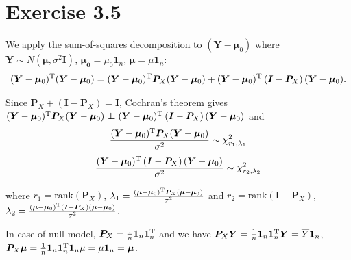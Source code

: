 \section*{Exercise 3.5}
We apply the sum-of-squares decomposition to $(\bm{Y} - \bm{\mu}_{0})$ where $\bm{Y} \sim N(\bm{\mu}, \sigma^2 \bm{I})$, $\bm{\mu_{0}} = \mu_{0}\bm{1}_{n}$, $\bm{\mu} = \mu\bm{1}_{n}$:
\begin{align*}
(\bm{Y} - \bm{\mu}_{0})^{\rm T}(\bm{Y} - \bm{\mu}_{0}) = (\bm{Y} - \bm{\mu}_{0})^{\rm T}\bm{P}_{X}(\bm{Y} - \bm{\mu}_{0}) + (\bm{Y} - \bm{\mu}_{0})^{\rm T}\left(\bm{I} - \bm{P}_{X} \right)(\bm{Y} - \bm{\mu}_{0}).
\end{align*}

Since $\bm{P}_{X} + (\bm{I} -\bm{P}_{X}) = \bm{I}$, Cochran's theorem gives $(\bm{Y} - \bm{\mu}_{0})^{\rm T}\bm{P}_{X}(\bm{Y} - \bm{\mu}_{0}) \independent (\bm{Y} - \bm{\mu}_{0})^{\rm T}\left(\bm{I} - \bm{P}_{X} \right)(\bm{Y} - \bm{\mu}_{0})$ and
\begin{align*}
\frac{(\bm{Y} - \bm{\mu}_{0})^{\rm T}\bm{P}_{X}(\bm{Y} - \bm{\mu}_{0})}{\sigma^2} \sim \chi_{r_{1}, \lambda_{1}}^2
\end{align*}
\begin{align*}
\frac{(\bm{Y} - \bm{\mu}_{0})^{\rm T}\left(\bm{I} - \bm{P}_{X} \right)(\bm{Y} - \bm{\mu}_{0})}{\sigma^2} \sim \chi_{r_{2}, \lambda_{2}}^2
\end{align*}

where $r_{1} = \mathrm{rank}(\bm{P}_{X})$, $\lambda_{1} = \frac{(\bm{\mu} - \bm{\mu}_{0})^{\rm T} \bm{P}_{X} (\bm{\mu} - \bm{\mu}_{0})}{\sigma^2}$ and $r_{2} = \mathrm{rank}(\bm{I} - \bm{P}_{X})$, $\lambda_{2} = \frac{(\bm{\mu} - \bm{\mu}_{0})^{\rm T}\left(\bm{I} - \bm{P}_{X} \right)(\bm{\mu} - \bm{\mu}_{0})}{\sigma^2}$.


In case of null model, $\bm{P}_{X} = \frac{1}{n}\bm{1}_{n}\bm{1}_{n}^{\rm T}$ and we have $\bm{P}_{X}\bm{Y} = \frac{1}{n}\bm{1}_{n}\bm{1}_{n}^{\rm T}\bm{Y} = \overline{Y}\bm{1}_{n}$, $\bm{P}_{X}\bm{\mu} = \frac{1}{n}\bm{1}_{n}\bm{1}_{n}^{\rm T}\bm{1}_{n}\mu = \mu\bm{1}_{n} = \bm{\mu}$.\\


